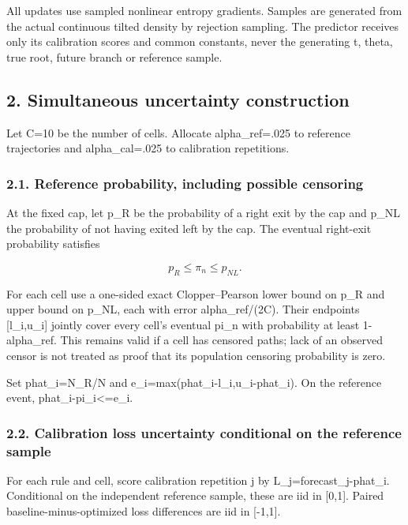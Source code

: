 All updates use sampled nonlinear entropy gradients. Samples are
generated from the actual continuous tilted density by rejection
sampling. The predictor receives only its calibration scores and common
constants, never the generating t, theta, true root, future branch or
reference sample.

\subsection{2. Simultaneous uncertainty
construction}\label{confirmation-simultaneous-uncertainty-construction}

Let C=10 be the number of cells. Allocate alpha\_ref=.025 to reference
trajectories and alpha\_cal=.025 to calibration repetitions.

\subsubsection{2.1. Reference probability, including possible
censoring}\label{confirmation-reference-probability-including-possible-censoring}

At the fixed cap, let p\_R be the probability of a right exit by the cap
and p\_NL the probability of not having exited left by the cap. The
eventual right-exit probability satisfies

\[
p_R\le\pi_n\le p_{NL}.
\]

For each cell use a one-sided exact Clopper--Pearson lower bound on p\_R
and upper bound on p\_NL, each with error alpha\_ref/(2C). Their
endpoints {[}l\_i,u\_i{]} jointly cover every cell's eventual pi\_n with
probability at least 1-alpha\_ref. This remains valid if a cell has
censored paths; lack of an observed censor is not treated as proof that
its population censoring probability is zero.

Set phat\_i=N\_R/N and e\_i=max(phat\_i-l\_i,u\_i-phat\_i). On the
reference event, \textbar phat\_i-pi\_i\textbar\textless=e\_i.

\subsubsection{2.2. Calibration loss uncertainty conditional on the
reference
sample}\label{confirmation-calibration-loss-uncertainty-conditional-on-the-reference-sample}

For each rule and cell, score calibration repetition j by
L\_j=\textbar forecast\_j-phat\_i\textbar. Conditional on the
independent reference sample, these are iid in {[}0,1{]}. Paired
baseline-minus-optimized loss differences are iid in {[}-1,1{]}.

